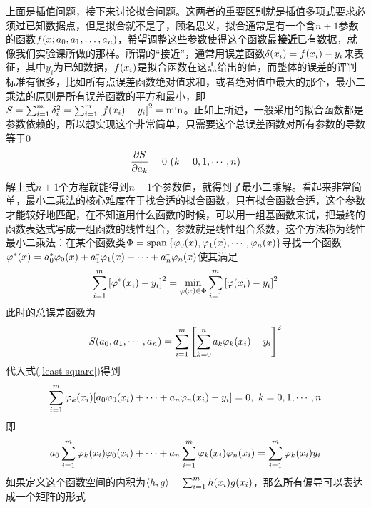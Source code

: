 \documentclass[12pt,a4paper,openany,twoside]{book}
\numberwithin{equation}{section}
\newcommand{\mean}[1]{\left\langle #1 \right\rangle}
\begin{document}
          上面是插值问题，接下来讨论拟合问题。这两者的重要区别就是插值多项式要求必须过已知数据点，但是拟合就不是了，顾名思义，拟合通常是有一个含$n+1$参数的函数$f\qty(x;a_0,a_1,\dots,a_n)$，希望调整这些参数使得这个函数最\textbf{接近}已有数据，就像我们实验课所做的那样。所谓的“接近”，通常用误差函数$\delta\qty(x_i)=f\qty(x_i)-y_i$来表征，其中$y_i$为已知数据，$f\qty(x_i)$是拟合函数在这点给出的值，而整体的误差的评判标准有很多，比如所有点误差函数绝对值求和，或者绝对值中最大的那个，最小二乘法的原则是所有误差函数的平方和最小，即$S=\sum_{i=1}^m{\delta_i^2}=\sum_{i=1}^m{\qty[f\qty(x_{i})-y_{i}]^{2}}=\min$。正如上所述，一般采用的拟合函数都是参数依赖的，所以想实现这个非常简单，只需要这个总误差函数对所有参数的导数等于0
          \begin{equation}
            \pdv{S}{a_k}=0\ \qty(k=0,1, \cdots, n)
            \label{least square}
          \end{equation}
          解上式$n+1$个方程就能得到$n+1$个参数值，就得到了最小二乘解。看起来非常简单，最小二乘法的核心难度在于找合适的拟合函数，只有拟合函数合适，这个参数才能较好地匹配，在不知道用什么函数的时候，可以用一组基函数来试，把最终的函数表达式写成一组函数的线性组合，参数就是线性组合系数，这个方法称为线性最小二乘法：在某个函数类$\Phi=\operatorname{span}\qty{\varphi_0\qty(x),\varphi_1\qty(x),\cdots,\varphi_n\qty(x)}$寻找一个函数$\varphi^*\qty(x)=a_0^*\varphi_0\qty(x)+a_1^* \varphi_1\qty(x)+\cdots+a_n^*\varphi_n\qty(x)$使其满足
          \begin{equation}
            \sum_{i=1}^m{\qty[\varphi^*\qty(x_i)-y_i]^2}=\min_{\varphi\qty(x) \in \Phi}\sum_{i=1}^m{\qty[\varphi\qty(x_i)-y_i]^2}
          \end{equation}
          此时的总误差函数为
          \begin{equation}
            S\qty(a_0,a_1,\cdots,a_n)=\sum_{i=1}^m{\qty[\sum_{k=0}^n{a_k\varphi_k\qty(x_i)}-y_i]^2}
          \end{equation}
          代入式(\ref{least square})得到
          \begin{equation}
            \sum_{i=1}^m{\varphi_k\qty(x_i)\qty[a_0\varphi_0\qty(x_i)+\cdots+a_n\varphi_n\qty(x_i)-y_i]}=0,\ k=0,1,\cdots,n
          \end{equation}
          即
          \begin{equation}
            a_0\sum_{i=1}^m{\varphi_k\qty(x_i)\varphi_0\qty(x_i)}+\cdots+a_n\sum_{i=1}^m{\varphi_k\qty(x_i)\varphi_n\qty(x_i)}=\sum_{i=1}^m{\varphi_k\qty(x_i)y_i}
          \end{equation}
          如果定义这个函数空间的内积为$\mean{h,g}=\sum_{i=1}^m{h\qty(x_i)g\qty(x_i)}$，那么所有偏导可以表达成一个矩阵的形式
\end{document}
